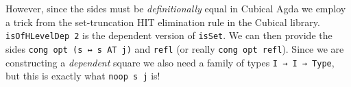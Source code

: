 However, since the sides must be \emph{definitionally} equal in Cubical Agda we employ
a trick from the set-truncation HIT elimination rule in the Cubical library. \texttt{isOfHLevelDep 2}
is the dependent version of \texttt{isSet}. We can then provide the sides
\texttt{cong opt (s ↔ s AT j)} and \texttt{refl} (or really \texttt{cong opt refl}). Since we are
constructing a \emph{dependent} square we also need a family of types \texttt{I → I → Type}, but this
is exactly what \texttt{noop s j} is!

\begin{code}%
\>[0]\AgdaSpace{}%
\AgdaSymbol{(}\AgdaSpace{}%
\AgdaSpace{}%
\AgdaSpace{}%
\AgdaSpace{}%
\AgdaSymbol{)}\AgdaSpace{}%
\AgdaSymbol{=}\AgdaSpace{}%
\AgdaSpace{}%
\<%
\\
\>[0][@{}l@{\AgdaIndent{0}}]%
\>[2]\AgdaSymbol{(}\AgdaSpace{}%
\AgdaSpace{}%
\AgdaSpace{}%
\AgdaSpace{}%
\AgdaSymbol{)}\<%
\\
%
\>[2]\AgdaSymbol{\AgdaUnderscore{}}\AgdaSpace{}%
\AgdaSymbol{\AgdaUnderscore{}}\AgdaSpace{}%
\AgdaSymbol{(}\AgdaSpace{}%
\AgdaSpace{}%
\AgdaSymbol{(}\AgdaSpace{}%
\AgdaSpace{}%
\AgdaSpace{}%
\AgdaSpace{}%
\AgdaSymbol{))}\AgdaSpace{}%
\AgdaSpace{}%
\AgdaSymbol{(}\AgdaSpace{}%
\AgdaSpace{}%
\AgdaSymbol{)}\AgdaSpace{}%
\AgdaSpace{}%
\<%
\end{code}
\begin{code}[hide]%
%
\>[2]\<%
\end{code}

